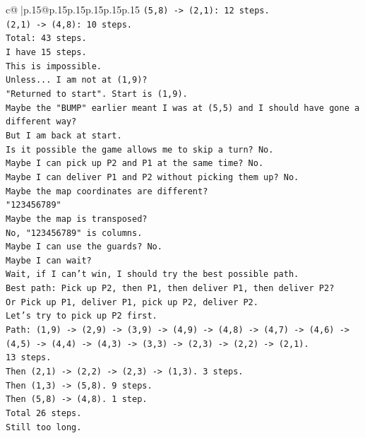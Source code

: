 \documentclass{article}
\begin{document}
{\begin{supertabular}{c@{$\;$}|p{.15\linewidth}@{}p{.15\linewidth}p{.15\linewidth}p{.15\linewidth}p{.15\linewidth}p{.15\linewidth}}
{{{\texttt{(5,8) {-}> (2,1): 12 steps.} \\
\texttt{(2,1) {-}> (4,8): 10 steps.} \\
\texttt{Total: 43 steps.} \\
\texttt{I have 15 steps.} \\
\texttt{This is impossible.} \\
\texttt{Unless... I am not at (1,9)?} \\
\texttt{"Returned to start". Start is (1,9).} \\
\texttt{Maybe the "BUMP" earlier meant I was at (5,5) and I should have gone a different way?} \\
\texttt{But I am back at start.} \\
\texttt{Is it possible the game allows me to skip a turn? No.} \\
\texttt{Maybe I can pick up P2 and P1 at the same time? No.} \\
\texttt{Maybe I can deliver P1 and P2 without picking them up? No.} \\
\texttt{Maybe the map coordinates are different?} \\
\texttt{"123456789"} \\
\texttt{Maybe the map is transposed?} \\
\texttt{No, "123456789" is columns.} \\
\texttt{Maybe I can use the guards? No.} \\
\texttt{Maybe I can wait?} \\
\texttt{Wait, if I can't win, I should try the best possible path.} \\
\texttt{Best path: Pick up P2, then P1, then deliver P1, then deliver P2?} \\
\texttt{Or Pick up P1, deliver P1, pick up P2, deliver P2.} \\
\texttt{Let's try to pick up P2 first.} \\
\texttt{Path: (1,9) {-}> (2,9) {-}> (3,9) {-}> (4,9) {-}> (4,8) {-}> (4,7) {-}> (4,6) {-}> (4,5) {-}> (4,4) {-}> (4,3) {-}> (3,3) {-}> (2,3) {-}> (2,2) {-}> (2,1).} \\
\texttt{13 steps.} \\
\texttt{Then (2,1) {-}> (2,2) {-}> (2,3) {-}> (1,3). 3 steps.} \\
\texttt{Then (1,3) {-}> (5,8). 9 steps.} \\
\texttt{Then (5,8) {-}> (4,8). 1 step.} \\
\texttt{Total 26 steps.} \\
\texttt{Still too long.} \\
}}}
\end{supertabular}}
\end{document}
